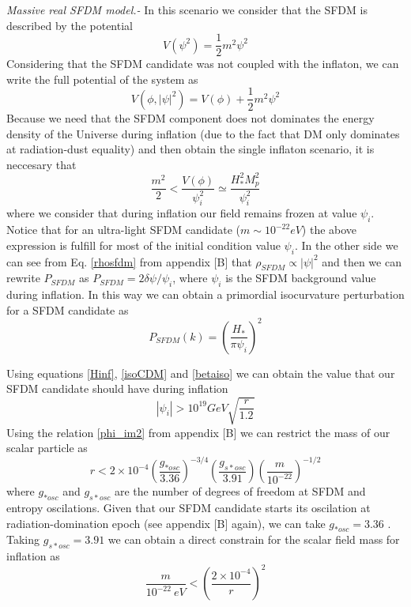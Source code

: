 \documentclass[amssymb,twocolumn,prd,nofootinbib,showpacs]{revtex4-1}
\begin{document}
\textit{Massive real SFDM model.-} In this scenario we consider that the SFDM is described by the potential
\begin{equation}
V(\psi^2)=\frac{1}{2}m^2\psi^2
\end{equation}
Considering that the SFDM candidate was not coupled with the inflaton, we can write the full potential of the system as
\begin{equation}
V(\phi,|\psi|^2)=V(\phi)+\frac{1}{2}m^2\psi^2
\end{equation}
Because we need that the SFDM component does not dominates the energy density of the Universe during inflation (due to the fact that DM only dominates at radiation-dust equality) and then obtain the single inflaton scenario, it is neccesary that 
\begin{equation}
\frac{m^2}{2} < \frac{V(\phi)}{\psi_i^2}\simeq \frac{H^2_{*}M_p^2}{\psi_i^2}
\end{equation}
where we consider that during inflation our field remains frozen  at value $\psi_i$. Notice that for an ultra-light SFDM candidate  ($m\sim 10^{-22}eV$) the above expression is fulfill for most of the initial condition value $\psi_i$. In the other side we can see from Eq. \eqref{rhosfdm} from appendix [B] that $\rho_{SFDM}\propto |\psi|^2$ and then we can rewrite $P_{SFDM}$ as 
$P_{SFDM} = 2\delta \psi/\psi_i
$, where $\psi_i$ is the SFDM background value during inflation. In this way we can obtain a primordial isocurvature perturbation for a SFDM candidate as
\begin{equation}
P_{SFDM}(k)=\left(\frac{H_*}{\pi \psi_i}\right)^2
\end{equation}

Using equations  \eqref{Hinf}, \eqref{isoCDM} and \eqref{betaiso} we can obtain the value that our SFDM candidate should have during inflation
\begin{equation}\label{initial_c}
|\psi_i|>10^{19}GeV\sqrt{\frac{r}{1.2}}
\end{equation}
Using the relation \eqref{phi_im2} from appendix [B] we can restrict the mass of our scalar particle as  
\begin{equation}
r<2\times 10^{-4}\left(\frac{g_{*osc}}{3.36}\right)^{-3/4}\left(\frac{g_{s*osc}}{3.91}\right)\left(\frac{m}{10^{-22}}\right)^{-1/2}
\end{equation}
where $g_{*osc}$ and $g_{s*osc}$ are the number of degrees of freedom at SFDM and entropy oscilations. Given that our SFDM candidate starts its oscilation at radiation-domination epoch (see appendix [B] again), we can take $g_{*osc}=3.36$ \cite{effdeg}. Taking $g_{s*osc}=3.91$ we can obtain a direct constrain for the scalar field mass for inflation as 
\begin{equation}\label{constm}
\frac{m}{10^{-22}\ eV}<\left(\frac{2\times 10^{-4}}{r}\right)^2
\end{equation}
\end{document}
